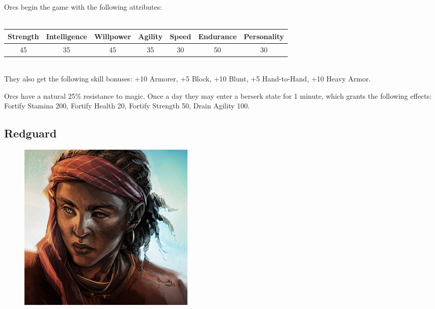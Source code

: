 \documentclass[12pt]{book}
\begin{document}
Orcs begin the game with the following attributes:\\~\\
\begin{tabular}{|c|c|c|c|c|c|c|}
\hline
Strength & Intelligence & Willpower & Agility & Speed & Endurance & Personality\\ \hline
45 & 35 & 45 & 35 & 30 & 50 & 30\\ \hline

\end{tabular}\\

They also get the following skill bonuses: +10 Armorer, +5 Block, +10 Blunt, +5 Hand-to-Hand, +10 Heavy Armor.

Orcs have a natural 25\% resistance to magic. Once a day they may enter a berserk state for 1 minute, which grants the following effects: Fortify Stamina 200, Fortify Health 20, Fortify Strength 50, Drain Agility 100.\\

\subsection{Redguard}
\begin{figure}
	\includegraphics[width=\textwidth]{Redguard.png}
\end{figure}
\end{document}
